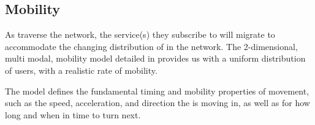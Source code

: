 \subsection{Mobility}
As \ues{} traverse the \xcloud{} network, the service(s) they subscribe to will migrate to accommodate the changing distribution of \ues{} in the network. The 2-dimensional, multi modal, mobility model detailed in \cite{bettstetter2001smooth} provides us with a uniform distribution of users, with a realistic rate of mobility.

The model defines the fundamental timing and mobility properties of \ue{} movement, such as the speed, acceleration, and direction the \ue{} is moving in, as well as for how long and when in time to turn next. 